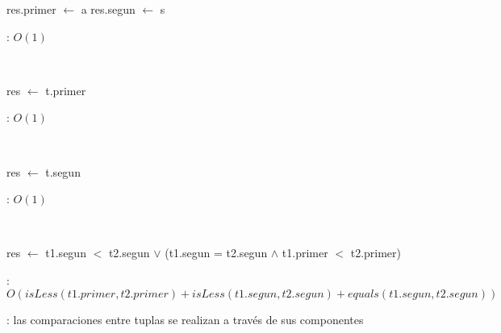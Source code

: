 \begin{Algoritmos}

	\begin{algorithm}[H]
		\NoCaptionOfAlgo
		\caption{}
		res.primer $\leftarrow$ a
		res.segun $\leftarrow$ s
	\end{algorithm}

	\complejidad: $O(1)$


	~

	\begin{algorithm}[H]
		\NoCaptionOfAlgo
		\caption{}
		res $\leftarrow$ t.primer
	\end{algorithm}

	\complejidad: $O(1)$

	~

	\begin{algorithm}[H]
		\NoCaptionOfAlgo
		\caption{}
		res $\leftarrow$ t.segun
	\end{algorithm}

	\complejidad: $O(1)$

	~

	\begin{algorithm}[H]
		\NoCaptionOfAlgo
		\caption{}
		res $\leftarrow$ t1.segun $<$ t2.segun $\lor$ (t1.segun = t2.segun $\land$ t1.primer $<$ t2.primer)
	\end{algorithm}

	\complejidad: $O(isLess(t1.primer, t2.primer) + isLess(t1.segun, t2.segun) + equals(t1.segun, t2.segun))$

	\justifcomp: las comparaciones entre tuplas se realizan a través de sus componentes

\end{Algoritmos}